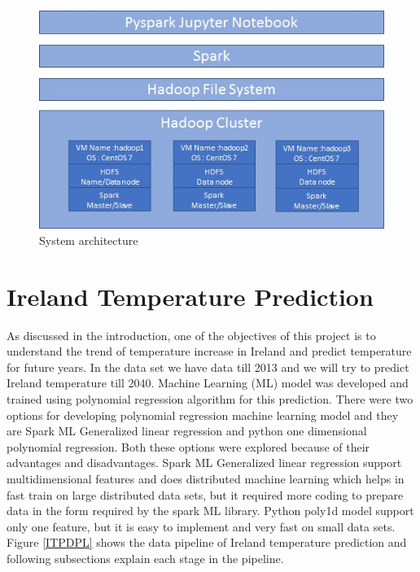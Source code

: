 \documentclass[journal,twoside,web]{ieeecolor}
\begin{document}
\begin{figure}[h]
\centering
\captionsetup{justification=centering}
\includegraphics[scale=.65]{System_architecture.jpg}
\caption{System architecture}
\label{SA}
\end{figure}

\section{Ireland Temperature Prediction}
As discussed in the introduction, one of the objectives of this project is to understand the trend of temperature increase in Ireland and predict temperature for future years.  In the data set we have data till 2013 and we will try to predict Ireland temperature till 2040.  Machine Learning (ML) model was developed and trained using polynomial regression algorithm for this prediction.  There were two options for developing polynomial regression machine learning model and they are Spark ML Generalized linear regression and python one dimensional polynomial regression.  Both these options were explored because of their advantages and disadvantages.  Spark ML Generalized linear regression support multidimensional features and does distributed machine learning which helps in fast train on large distributed data sets, but it required more coding to prepare data in the form required by the spark ML library. Python poly1d model support only one feature, but it is easy to implement and very fast on small data sets. Figure \ref{ITPDPL} shows the data pipeline of Ireland temperature prediction and following subsections explain each stage in the pipeline.
\end{document}
